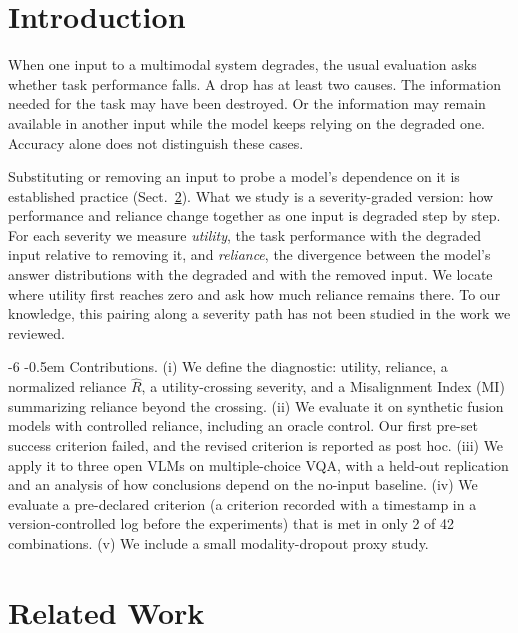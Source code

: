 \documentclass[graybox]{svmult}
\makeatletter
\newcommand{\checknum}[2]{#1}
\renewcommand\paragraph{\@startsection{paragraph}{4}{\z@}%
  {-6\p@ \@plus -2\p@ \@minus -2\p@}%
  {-0.5em}%
  {\normalfont\normalsize\bfseries}}
\makeatother
\begin{document}
\section{Introduction}
\label{sec:intro}

When one input to a multimodal system degrades, the usual evaluation asks
whether task performance falls. A drop has at least two causes. The
information needed for the task may have been destroyed. Or the information
may remain available in another input while the model keeps relying on the
degraded one. Accuracy alone does not distinguish these cases.

Substituting or removing an input to probe a model's dependence on it is
established practice (Sect.~\ref{sec:related}). What we study is a
severity-graded version: how performance and reliance change together as
one input is degraded step by step. For each severity we measure
\emph{utility}, the task performance with the degraded input relative to
removing it, and \emph{reliance}, the divergence between the model's
answer distributions with the degraded and with the removed input. We
locate where utility first reaches zero and ask how much reliance remains
there. To our knowledge, this pairing along a severity path has not been
studied in the work we reviewed.

\paragraph{Contributions.}
(i) We define the diagnostic: utility, reliance, a normalized reliance
$\hat R$, a utility-crossing severity, and a Misalignment Index (MI)
summarizing reliance beyond the crossing. (ii) We evaluate it on synthetic
fusion models with controlled reliance, including an oracle control. Our
first pre-set success criterion failed, and the revised criterion is
reported as post hoc. (iii) We apply it to three open VLMs on
multiple-choice VQA, with a held-out replication and an analysis of how
conclusions depend on the no-input baseline. (iv) We evaluate a pre-declared criterion (a criterion recorded with a timestamp in a version-controlled log before the experiments) that is met in only \checknum{2}{criterion:status:count_met} of 42
combinations. (v) We
include a small modality-dropout proxy study.

\section{Related Work}
\label{sec:related}
\end{document}
